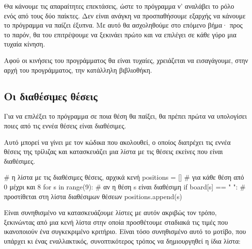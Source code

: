 \documentclass[a4paper,11pt,oneside]{book}
\begin{document}
Θα κάνουμε τις απαραίτητες επεκτάσεις, ώστε το πρόγραμμα ν' αναλάβει το ρόλο ενός από τους δύο παίκτες. Δεν είναι ανάγκη να προσπαθήσουμε εξαρχής να κάνουμε το πρόγραμμα να παίζει έξυπνα. Με αυτό θα ασχοληθούμε στο επόμενο βήμα· προς το παρόν, θα του επιτρέψουμε να ξεκινάει πρώτο και να επιλέγει σε κάθε γύρο μια τυχαία κίνηση.

Αφού οι κινήσεις του προγράμματος θα είναι τυχαίες, χρειάζεται να εισαγάγουμε, στην αρχή του προγράμματος, την κατάλληλη βιβλιοθήκη.


\subsection{Οι διαθέσιμες θέσεις}

Για να επιλέξει το πρόγραμμα σε ποια θέση θα παίξει, θα πρέπει πρώτα να υπολογίσει ποιες από τις εννέα θέσεις είναι διαθέσιμες. 

Αυτό μπορεί να γίνει με τον κώδικα που ακολουθεί, ο οποίος διατρέχει τις εννέα θέσεις της τρίλιζας και κατασκευάζει μια λίστα με τις θέσεις εκείνες που είναι διαθέσιμες.

\begin{pyplain}
# η λίστα με τις διαθέσιμες θέσεις, αρχικά κενή
positions = []
# για κάθε θέση από 0 μέχρι και 8
for s in range(9):
    # αν η θέση s είναι διαθέσιμη
    if board[s] == " ":
        # προστίθεται στη λίστα διαθέσιμων θέσεων
        positions.append(s)
\end{pyplain}

Είναι συνηθισμένο να κατασκευάζουμε λίστες με αυτόν ακριβώς τον τρόπο, ξεκινώντας από μια κενή λίστα στην οποία προσθέτουμε σταδιακά τις τιμές που ικανοποιούν ένα συγκεκριμένο κριτήριο. Είναι τόσο συνηθισμένο αυτό το μοτίβο, που υπάρχει κι ένας εναλλακτικός, συνοπτικότερος τρόπος να δημιουργηθεί η ίδια λίστα:
\end{document}
